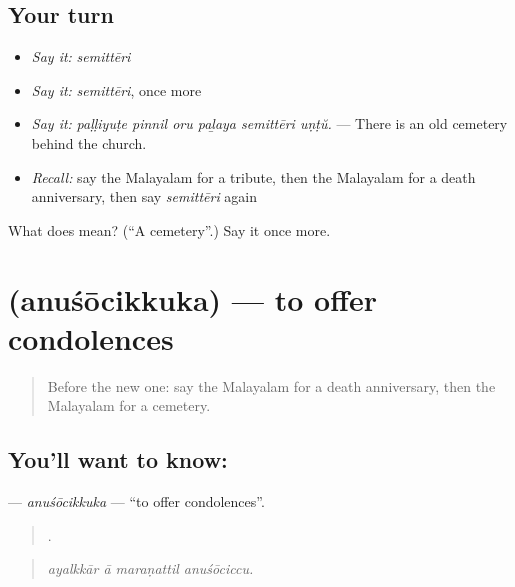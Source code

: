 \subsection*{Your turn}
\begin{itemize}
\raggedright
  \item \emph{Say it:} \emph{semittēri}
  \item \emph{Say it:} \emph{semittēri}, once more
  \item \emph{Say it:} \emph{paḷḷiyuṭe pinnil oru paḻaya semittēri uṇṭŭ.} — There is an old cemetery behind the church.
  \item \emph{Recall:} say the Malayalam for a tribute, then the Malayalam for a death anniversary, then say \emph{semittēri} again
\end{itemize}

\begin{tcolorbox}[breakable,colback=teal!4,colframe=teal!35!black,title={Before you move on}]
What does  mean? (\textquotedblleft{}A cemetery\textquotedblright{}.) Say it once more.
\end{tcolorbox}
\section[\texorpdfstring{\ml{അനുശോചിക്കുക} (anuśōcikkuka)}{അനുശോചിക്കുക (anuśōcikkuka)}]{ (anuśōcikkuka) — to offer condolences}

\label{lesson:ML-C392-anusocikkuka}



\begin{quote}
Before the new one: say the Malayalam for a death anniversary, then the Malayalam for a cemetery.
\end{quote}

\subsection*{You'll want to know: }
\textbf{} — \emph{anuśōcikkuka} — \textquotedblleft{}to offer condolences\textquotedblright{}.

\begin{quote}
   .
\end{quote}

\begin{quote}
\emph{ayalkkār ā maraṇattil anuśōciccu.}
\end{quote}

